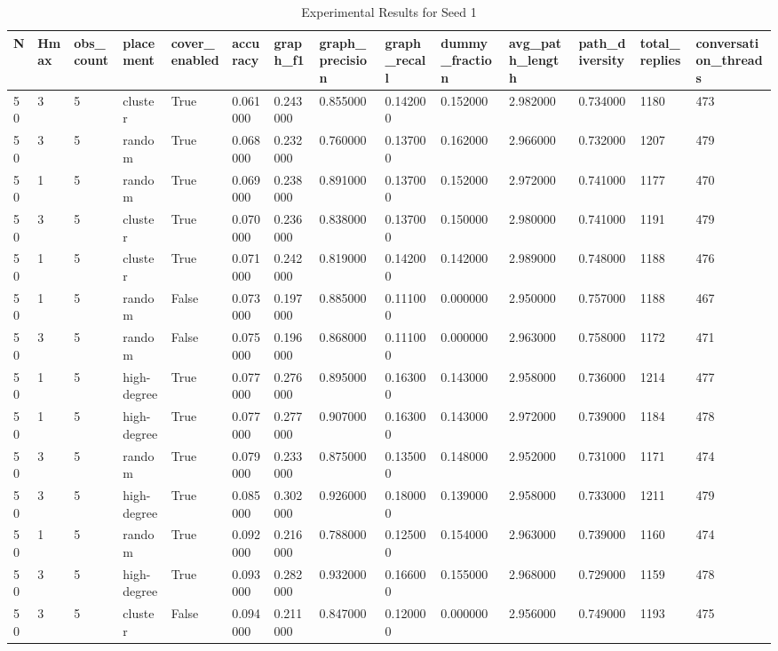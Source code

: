 \begin{table}
\caption{Experimental Results for Seed 1}
\label{tab:results_seed_1}
\begin{tabular}{llllllllllllll}
\toprule
N & Hmax & obs_count & placement & cover_enabled & accuracy & graph_f1 & graph_precision & graph_recall & dummy_fraction & avg_path_length & path_diversity & total_replies & conversation_threads \\
\midrule
50 & 3 & 5 & cluster & True & 0.061000 & 0.243000 & 0.855000 & 0.142000 & 0.152000 & 2.982000 & 0.734000 & 1180 & 473 \\
50 & 3 & 5 & random & True & 0.068000 & 0.232000 & 0.760000 & 0.137000 & 0.162000 & 2.966000 & 0.732000 & 1207 & 479 \\
50 & 1 & 5 & random & True & 0.069000 & 0.238000 & 0.891000 & 0.137000 & 0.152000 & 2.972000 & 0.741000 & 1177 & 470 \\
50 & 3 & 5 & cluster & True & 0.070000 & 0.236000 & 0.838000 & 0.137000 & 0.150000 & 2.980000 & 0.741000 & 1191 & 479 \\
50 & 1 & 5 & cluster & True & 0.071000 & 0.242000 & 0.819000 & 0.142000 & 0.142000 & 2.989000 & 0.748000 & 1188 & 476 \\
50 & 1 & 5 & random & False & 0.073000 & 0.197000 & 0.885000 & 0.111000 & 0.000000 & 2.950000 & 0.757000 & 1188 & 467 \\
50 & 3 & 5 & random & False & 0.075000 & 0.196000 & 0.868000 & 0.111000 & 0.000000 & 2.963000 & 0.758000 & 1172 & 471 \\
50 & 1 & 5 & high-degree & True & 0.077000 & 0.276000 & 0.895000 & 0.163000 & 0.143000 & 2.958000 & 0.736000 & 1214 & 477 \\
50 & 1 & 5 & high-degree & True & 0.077000 & 0.277000 & 0.907000 & 0.163000 & 0.143000 & 2.972000 & 0.739000 & 1184 & 478 \\
50 & 3 & 5 & random & True & 0.079000 & 0.233000 & 0.875000 & 0.135000 & 0.148000 & 2.952000 & 0.731000 & 1171 & 474 \\
50 & 3 & 5 & high-degree & True & 0.085000 & 0.302000 & 0.926000 & 0.180000 & 0.139000 & 2.958000 & 0.733000 & 1211 & 479 \\
50 & 1 & 5 & random & True & 0.092000 & 0.216000 & 0.788000 & 0.125000 & 0.154000 & 2.963000 & 0.739000 & 1160 & 474 \\
50 & 3 & 5 & high-degree & True & 0.093000 & 0.282000 & 0.932000 & 0.166000 & 0.155000 & 2.968000 & 0.729000 & 1159 & 478 \\
50 & 3 & 5 & cluster & False & 0.094000 & 0.211000 & 0.847000 & 0.120000 & 0.000000 & 2.956000 & 0.749000 & 1193 & 475 \\

\end{tabular}
\end{table}
